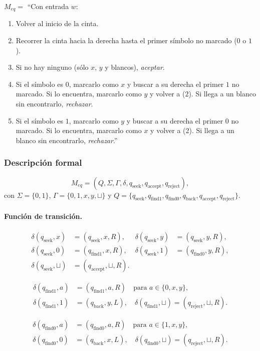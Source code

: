 \documentclass[11pt,a4paper]{article}
\theoremstyle{plain}
\theoremstyle{definition}
\theoremstyle{remark}
\newcommand{\qaccept}{q_{\text{accept}}}
\newcommand{\qreject}{q_{\text{reject}}}
\newcommand{\qseek}{q_{\text{seek}}}
\newcommand{\qfindone}{q_{\text{find1}}}
\newcommand{\qfindzero}{q_{\text{find0}}}
\newcommand{\qback}{q_{\text{back}}}
\newcommand{\blank}{\sqcup}
\begin{document}
\(M_{eq}=\) ``Con entrada $w$:
\begin{enumerate}
  \item Volver al inicio de la cinta.
  \item Recorrer la cinta hacia la derecha hasta el primer s\'imbolo no
        marcado ($0$ o $1$).
  \item Si no hay ninguno (s\'olo $x$, $y$ y blancos), \emph{aceptar}.
  \item Si el s\'imbolo es $0$, marcarlo como $x$ y buscar a su derecha
        el primer $1$ no marcado. Si lo encuentra, marcarlo como $y$ y
        volver a (2). Si llega a un blanco sin encontrarlo, \emph{rechazar}.
  \item Si el s\'imbolo es $1$, marcarlo como $y$ y buscar a su derecha
        el primer $0$ no marcado. Si lo encuentra, marcarlo como $x$ y
        volver a (2). Si llega a un blanco sin encontrarlo, \emph{rechazar}.''
\end{enumerate}

\subsubsection*{Descripci\'on formal}

\[
  M_{eq} = (Q, \Sigma, \Gamma, \delta, \qseek, \qaccept, \qreject),
\]
con $\Sigma=\{0,1\}$, $\Gamma=\{0,1,x,y,\blank\}$ y
$Q = \{\qseek, \qfindone, \qfindzero, \qback, \qaccept, \qreject\}$.

\paragraph{Funci\'on de transici\'on.}

\begin{align*}
\delta(\qseek,x) &= (\qseek,x,R), &
\delta(\qseek,y) &= (\qseek,y,R),\\
\delta(\qseek,0) &= (\qfindone,x,R), &
\delta(\qseek,1) &= (\qfindzero,y,R),\\
\delta(\qseek,\blank) &= (\qaccept,\blank,R). & &
\end{align*}

\begin{align*}
\delta(\qfindone,a) &= (\qfindone,a,R) \quad \text{para } a\in\{0,x,y\},\\
\delta(\qfindone,1) &= (\qback,y,L),\quad
\delta(\qfindone,\blank) = (\qreject,\blank,R).
\end{align*}

\begin{align*}
\delta(\qfindzero,a) &= (\qfindzero,a,R) \quad \text{para } a\in\{1,x,y\},\\
\delta(\qfindzero,0) &= (\qback,x,L),\quad
\delta(\qfindzero,\blank) = (\qreject,\blank,R).
\end{align*}
\end{document}
